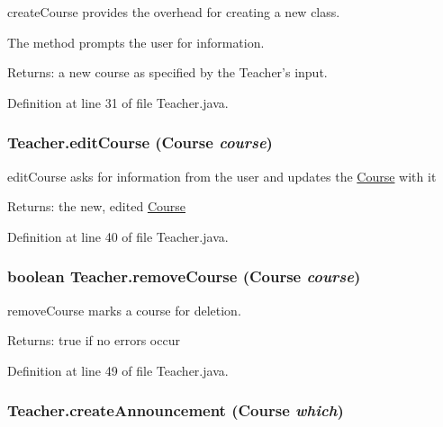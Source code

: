 createCourse provides the overhead for creating a new class. 

The method prompts the user for information. \begin{Desc}
\item[Returns:]a new course as specified by the Teacher's input. \end{Desc}


Definition at line 31 of file Teacher.java.\hypertarget{classTeacher_96b4f128632f448448cc2709693d0364}{
\subsubsection{ Teacher.editCourse ({\bf Course} {\em course})}}
\label{classTeacher_96b4f128632f448448cc2709693d0364}


editCourse asks for information from the user and updates the \hyperlink{classCourse}{Course} with it 

\begin{Desc}
\item[Returns:]the new, edited \hyperlink{classCourse}{Course} \end{Desc}


Definition at line 40 of file Teacher.java.\hypertarget{classTeacher_84380b3ae21b6eb70b116db75378acfc}{
\subsubsection{\setlength{\rightskip}{0pt plus 5cm}boolean Teacher.removeCourse ({\bf Course} {\em course})}}
\label{classTeacher_84380b3ae21b6eb70b116db75378acfc}


removeCourse marks a course for deletion. 

\begin{Desc}
\item[Returns:]true if no errors occur \end{Desc}


Definition at line 49 of file Teacher.java.\hypertarget{classTeacher_f301f7cf4ee9bda24caea174ba1bfd13}{
\subsubsection{ Teacher.createAnnouncement ({\bf Course} {\em which})}}
\label{classTeacher_f301f7cf4ee9bda24caea174ba1bfd13}


